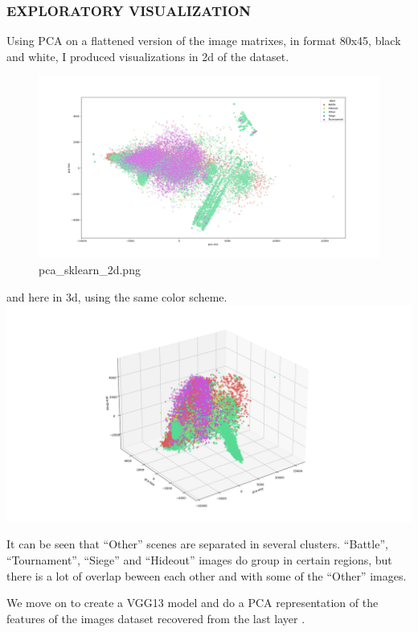 \documentclass[
]{article}
\begin{document}
\hypertarget{exploratory-visualization}{%
\subsubsection{EXPLORATORY
VISUALIZATION}\label{exploratory-visualization}}

Using PCA on a flattened version of the image matrixes, in format 80x45,
black and white, I produced visualizations in 2d of the dataset.

\begin{figure}
\centering
\includegraphics{visualizations/pca_sklearn_2d_80_45_L.png}
\caption{pca\_sklearn\_2d.png}
\end{figure}

and here in 3d, using the same color scheme.
\includegraphics{visualizations/pca_sklearn_3d_80_45_L.png}

It can be seen that ``Other'' scenes are separated in several clusters.
``Battle'', ``Tournament'', ``Siege'' and ``Hideout'' images do group in
certain regions, but there is a lot of overlap beween each other and
with some of the ``Other'' images.

We move on to create a VGG13 model and do a PCA representation of the
features of the images dataset recovered from the last layer .
\end{document}
